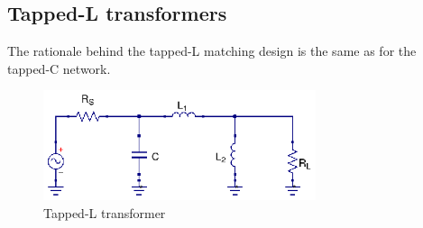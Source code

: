 \subsection{Tapped-L transformers}
\noindent The rationale behind the tapped-L matching design is the same as for the tapped-C network.

\begin{figure}[H]
\centering
\includegraphics[width=80mm]{Tapped-L}
\caption{Tapped-L transformer}
\label{fig:tapped-c-transformer}
\end{figure}

